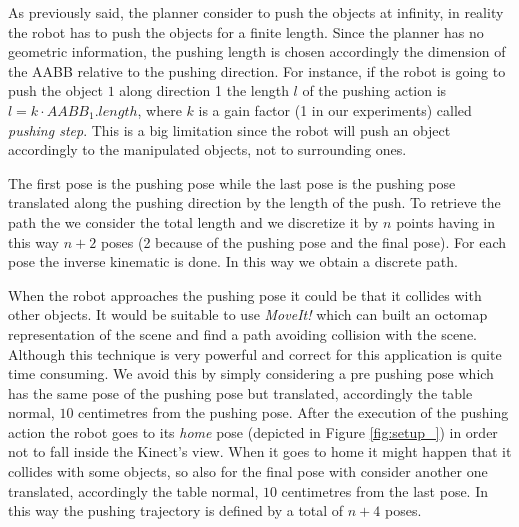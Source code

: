 As previously said, the planner consider to push the objects at infinity, in reality the robot has to push the objects for a finite length. Since the planner has no geometric information, the pushing length is chosen accordingly the dimension of the AABB relative to the pushing direction. For instance, if the robot is going to push the object $1$ along direction 1 the length $l$ of the pushing action is $l=k \cdot AABB_1.length$, where $k$ is a gain factor (1 in our experiments) called \textit{pushing step}. This is a big limitation since the robot will push an object accordingly to the manipulated objects, not to surrounding ones. 

The first pose is the pushing pose while the last pose is the pushing pose translated along the pushing direction by the length of the push. To retrieve the path the we consider the total length and we discretize it by $n$ points having in this way $n+2$ poses (2 because of the pushing pose and the final pose). For each pose the inverse kinematic is done. In this way we obtain a discrete path. 

When the robot approaches the pushing pose it could be that it collides with other objects. It would be suitable to use \textit{MoveIt!} which can built an octomap representation of the scene and find a path avoiding collision with the scene. Although this technique is very powerful and correct for this application is quite time consuming. We avoid this by simply considering a pre pushing pose which has the same pose of the pushing pose but translated, accordingly the table normal, $10$ centimetres from the pushing pose. 
After the execution of the pushing action the robot goes to its \textit{home} pose (depicted in Figure \ref{fig:setup_}) in order not to fall inside the Kinect's view. When it goes to home it might happen that it collides with some objects, so also for the final pose with consider another one translated, accordingly the table normal, $10$ centimetres from the last pose. 
In this way the pushing trajectory is defined by a total of $n+4$ poses. 



